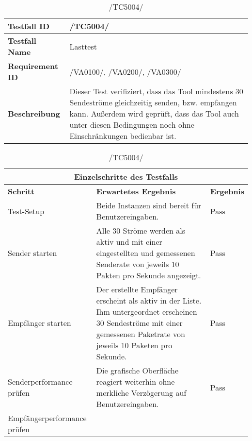     \begin{table}[h]
        \caption{/TC5004/}
        \label{tab:TC5004}
        \begin{center}
            \begin{tabular}{|p{3.5cm}|p{11cm}|}
                \hline
                    \textbf{Testfall ID} & /TC5004/\\
                \hline
                    \textbf{Testfall Name} & Lasttest\\
                \hline
                    \textbf{Requirement ID} & /VA0100/, /VA0200/, /VA0300/\\
                \hline
                    \textbf{Beschreibung} & Dieser Test verifiziert, dass das
                    Tool mindestens 30 Sendeströme gleichzeitig senden, bzw.
                    empfangen kann. Außerdem wird geprüft, dass das Tool auch
                    unter diesen Bedingungen noch ohne Einschränkungen
                    bedienbar ist.\\
                \hline
            \end{tabular}
            \begin{tabular}{|p{4cm}|p{7.8cm}|p{2.3cm}|}
\multicolumn{3}{|c|}{\textbf{Einzelschritte des Testfalls}} \\
                \hline
                    \textbf{Schritt} & \textbf{Erwartetes Ergebnis} & \textbf{Ergebnis}\\
                \hline
                    Test-Setup & 
                    Beide Instanzen sind bereit für Benutzereingaben.& Pass\\
                \hline
                    Sender starten &
                    Alle 30 Ströme werden als aktiv und mit einer
                    eingestellten und gemessenen Senderate von jeweils 10
                    Pakten pro Sekunde angezeigt.& Pass\\
                \hline
                    Empfänger starten &
                    Der erstellte Empfänger erscheint als aktiv in der Liste.
                    Ihm untergeordnet erscheinen 30 Sendeströme mit einer
                    gemessenen Paketrate von jeweils 10 Paketen pro Sekunde.& Pass\\
                \hline
                    Senderperformance prüfen &
                    Die grafische Oberfläche reagiert weiterhin ohne merkliche
                    Verzögerung auf Benutzereingaben.& Pass\\
                \hline
                    Empfängerperformance prüfen &

\end{tabular}
\end{center}
\end{table}
